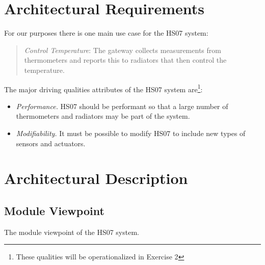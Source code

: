 \documentclass[a4paper,10pt]{article}
\begin{document}
\section{Architectural Requirements}
\label{sec:requirements}

For our purposes there is one main use case for the HS07 system:
\begin{quote}
  \emph{Control Temperature}: The gateway collects measurements from
  thermometers and reports this to radiators that then control the
  temperature.
\end{quote}

The major driving qualities attributes of the HS07 system
are\footnote{These qualities will be operationalized in Exercise 2}:

\begin{itemize}
\item \emph{Performance.} HS07 should be performant so that a large
  number of thermometers and radiators may be part of the system.
\item \emph{Modifiability.} It must be possible to modify HS07 to
  include new types of sensors and actuators.
\end{itemize}


\section{Architectural Description}

\subsection{Module Viewpoint}

The module viewpoint of the HS07 system.
\end{document}
